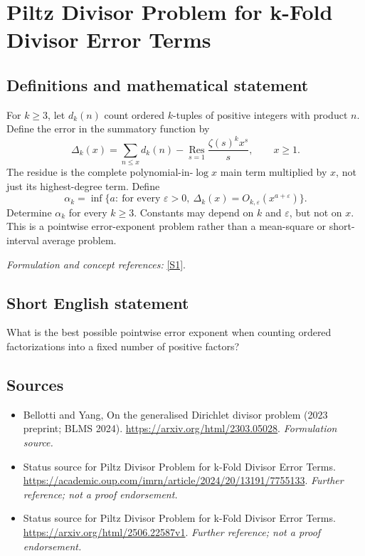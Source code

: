 \documentclass[11pt]{article}
\begin{document}
\section*{\texorpdfstring{Piltz Divisor Problem for k-Fold Divisor Error Terms}{Piltz Divisor Problem for k-Fold Divisor Error Terms}}\label{30006934}
\subsection{Definitions and mathematical statement}
For $k\ge3$, let $d_k(n)$ count ordered $k$-tuples of positive integers with product $n$. Define the error in the summatory function by
\[
 \Delta_k(x)=\sum_{n\le x}d_k(n)
 -\operatorname*{Res}_{s=1}\frac{\zeta(s)^k x^s}{s},\qquad x\ge1.
\]
The residue is the complete polynomial-in-$\log x$ main term multiplied by $x$, not just its highest-degree term. Define
\[
 \alpha_k=\inf\{a:\ \text{for every }{\varepsilon}>0,
 \ \Delta_k(x)=O_{k,{\varepsilon}}(x^{a+{\varepsilon}})\}.
\]
Determine $\alpha_k$ for every $k\ge3$. Constants may depend on $k$ and ${\varepsilon}$, but not on $x$. This is a pointwise error-exponent problem rather than a mean-square or short-interval average problem.
\par\smallskip\textit{Formulation and concept references:} \href{https://arxiv.org/html/2303.05028}{[S1]}.

\subsection{Short English statement}
What is the best possible pointwise error exponent when counting ordered factorizations into a fixed number of positive factors?
\subsection{Sources}
\begin{itemize}
\item[S1]Bellotti and Yang, On the generalised Dirichlet divisor problem (2023 preprint; BLMS 2024).
\url{https://arxiv.org/html/2303.05028}.
\textit{Formulation source.}
\item[S2]Status source for Piltz Divisor Problem for k-Fold Divisor Error Terms.
\url{https://academic.oup.com/imrn/article/2024/20/13191/7755133}.
\textit{Further reference; not a proof endorsement.}
\item[S3]Status source for Piltz Divisor Problem for k-Fold Divisor Error Terms.
\url{https://arxiv.org/html/2506.22587v1}.
\textit{Further reference; not a proof endorsement.}
\end{itemize}
\end{document}
